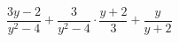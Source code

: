 \begin{ex}[type=expression]
	\begin{condition}
		\(\dfrac{3y-2}{y^2-4}+\dfrac{3}{y^2-4}\cdot\dfrac{y+2}{3}+\dfrac{y}{y+2}\)
	\end{condition}
\end{ex}